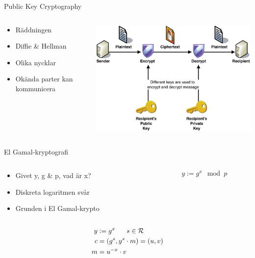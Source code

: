 \begin{frame}{Public Key Cryptography}

\begin{columns}
    \begin{column}{0.45\textwidth}
        \begin{itemize}
			\item Räddningen
			\item Diffie \& Hellman
			\item Olika nycklar
			\item Okända parter kan kommunicera
		\end{itemize}
    \end{column}
	\begin{column}{0.55\textwidth}
    	\includegraphics[width=\textwidth]{images/asymmetric.png}
	\end{column}
\end{columns}

\end{frame}

\begin{frame}{El Gamal-kryptografi}

\begin{columns}
	\begin{column}{0.5\textwidth}
		\begin{itemize}
			\item Givet y, g \& p, vad är x?
			\item Diskreta logaritmen svår
			\item Grunden i El Gamal-krypto
		\end{itemize}
	\end{column}
	\begin{column}{0.5\textwidth}
		{\LARGE $$y := g^x \mod{p}$$}
	\end{column}
\end{columns}

\vspace{3pt}

{\LARGE
\begin{align*}
y &\vcentcolon= g^{x} \,\,\,\,\,\,\,\,\,\, s\in \mathcal{R} \\
c &= (g^s, y^s\cdot m) = (u, v) \\
 m &= u^{-x}\cdot v
\end{align*}}

\end{frame}

